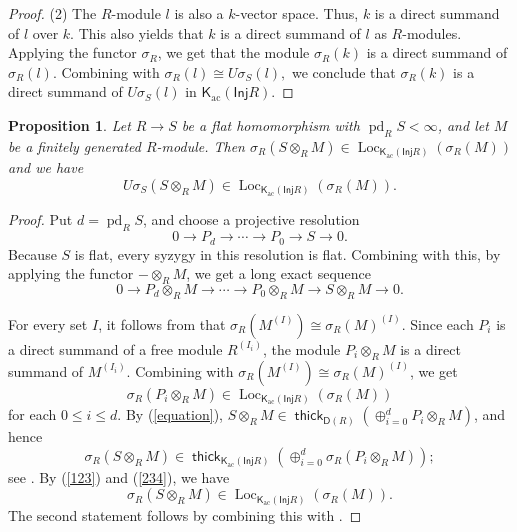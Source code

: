 \documentclass{amsart}
\newcommand{\D}{\mathsf{D}}
\newcommand{\K}{\mathsf{K}}
\newcommand{\0}{{\bf{0}}}
\DeclareMathOperator{\ac}{ac}
\DeclareMathOperator{\thick}{\mathsf{thick}}
\newcommand{\Inj}{\mathsf{Inj}}
\newtheorem{proposition}[theorem]{Proposition}
\theoremstyle{definition}
\begin{document}
\begin{proof}
(2) The $R$-module $l$ is also a $k$-vector space. Thus, $k$ is a direct summand of $l$ over $k$.  This also yields that $k$ is a direct summand of $l$ as $R$-modules. Applying the functor \(\sigma_R\), we get that the module $\sigma_R(k)$ is a direct summand of $\sigma_R(l)$. 
Combining with $\sigma_R(l)\cong U\sigma_S(l),
$
we conclude that $\sigma_R(k)$ is a direct summand of $U\sigma_S(l)$ in $\K_{\ac}(\Inj R)$. 
\end{proof}

\begin{proposition}\label{res:contain}
Let \(R\to S\) be a flat homomorphism with \(\operatorname{pd}_RS<\infty\), and let \(M\) be a finitely generated \(R\)-module. Then
$
\sigma_R(S\otimes_RM)
\in
\operatorname{Loc}_{\K_{\ac}(\Inj R)}(\sigma_R(M)) 
$ and we have
\[
U\sigma_S(S\otimes_RM)
\in
\operatorname{Loc}_{\K_{\ac}(\Inj R)}(\sigma_R(M)).
\]
\end{proposition}
\begin{proof}
Put \(d=\operatorname{pd}_RS\), and choose a projective resolution
\[
0\longrightarrow P_d\longrightarrow\cdots
\longrightarrow P_0\longrightarrow S\longrightarrow0.
\]
Because \(S\) is flat, every syzygy in this resolution is flat.  Combining with this, by applying the functor \(-\otimes_RM\), we get  a long exact sequence
\begin{equation}\label{equation}
    0\longrightarrow P_d\otimes_RM\longrightarrow\cdots
\longrightarrow P_0\otimes_RM
\longrightarrow S\otimes_RM\longrightarrow0.
\end{equation}

For every set \(I\), it follows from  that
$
\sigma_R(M^{(I)})\cong\sigma_R(M)^{(I)}.
$
Since each \(P_i\) is a direct summand of a free module \(R^{(I_i)}\), the module \(P_i\otimes_RM\) is a direct summand of \(M^{(I_i)}\). Combining with $
\sigma_R(M^{(I)})\cong\sigma_R(M)^{(I)}
$, we get
\begin{equation}\label{123}
   \sigma_R(P_i\otimes_RM)
\in
\operatorname{Loc}_{\K_{\ac}(\Inj R)}(\sigma_R(M))
\end{equation}
for each $0\leq i\leq d$. 
By (\ref{equation}), $S\otimes_R M\in \thick_{\D(R)}(\oplus_{i=0}^d P_i\otimes _R M)$, and hence 
\begin{equation}\label{234}
    \sigma_R(S\otimes_R M)
\in \thick_{\K_{\ac}(\Inj R)}(\oplus_{i=0}^d \sigma_R(P_i\otimes _R M));
\end{equation}
see \cite[Lemma 2.4(6)]{ABIM}.
By (\ref{123}) and (\ref{234}), we have 
\[
\sigma_R(S\otimes_RM)
\in
\operatorname{Loc}_{\K_{\ac}(\Inj R)}(\sigma_R(M)).
\]
The second statement follows by combining this with .
\end{proof}
\end{document}
